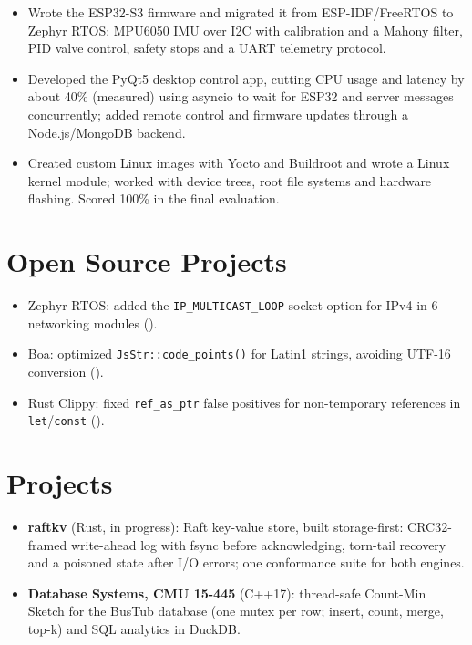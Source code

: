 \documentclass[10pt]{article}
\begin{document}
\begin{itemize}
  \item Wrote the ESP32-S3 firmware and migrated it from ESP-IDF/FreeRTOS to Zephyr RTOS: MPU6050 IMU over I2C with calibration and a Mahony filter, PID valve control, safety stops and a UART telemetry protocol.
  \item Developed the PyQt5 desktop control app, cutting CPU usage and latency by about 40\% (measured) using asyncio to wait for ESP32 and server messages concurrently; added remote control and firmware updates through a Node.js/MongoDB backend.
\end{itemize}
\begin{itemize}
  \item Created custom Linux images with Yocto and Buildroot and wrote a Linux kernel module; worked with device trees, root file systems and hardware flashing. Scored 100\% in the final evaluation.
\end{itemize}

\section*{Open Source Projects}
\begin{itemize}
  \item Zephyr RTOS: added the \texttt{IP\_MULTICAST\_LOOP} socket option for IPv4 in 6 networking modules ().
  \item Boa: optimized \texttt{JsStr::code\_points()} for Latin1 strings, avoiding UTF-16 conversion ().
  \item Rust Clippy: fixed \texttt{ref\_as\_ptr} false positives for non-temporary references in \texttt{let}/\texttt{const} ().
\end{itemize}

\section*{Projects}
\begin{itemize}
  \item \textbf{raftkv} (Rust, in progress): Raft key-value store, built storage-first: CRC32-framed write-ahead log with fsync before acknowledging, torn-tail recovery and a poisoned state after I/O errors; one conformance suite for both engines. 
  \item \textbf{Database Systems, CMU 15-445} (C++17): thread-safe Count-Min Sketch for the BusTub database (one mutex per row; insert, count, merge, top-k) and SQL analytics in DuckDB. 
\end{itemize}
\end{document}
